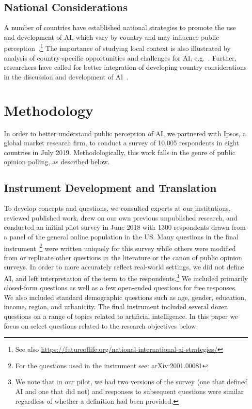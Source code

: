 \documentclass[sigconf]{acmart}
\begin{document}
\subsection{National Considerations}
A number of countries have established national strategies to promote the use and development of AI, which vary by country and may influence public perception~\cite{dutton2018}.\footnote{See also \url{https://futureoflife.org/national-international-ai-strategies/}} 
The importance of studying local context is also illustrated by analysis of country-specific opportunities and challenges for AI, e.g.~\cite{kalyanakrishnan2018opportunities}.
Further, researchers have called for better integration of developing country considerations in the discussion and development of AI~\cite{sambasivan2019toward}.
 
\section{Methodology}
In order to better understand public perception of AI, 
we partnered with Ipsos, a global market research firm, 
to conduct a survey of 10,005 respondents in eight countries in July 2019. Methodologically, this work falls in the genre of public opinion polling, as described below.

\subsection{Instrument Development and Translation}
To develop concepts and questions, we consulted experts at our institutions, reviewed published work, drew on our own previous unpublished research, and conducted an initial pilot survey in June 2018 with 1300 respondents drawn from a panel of the general online population in the US. Many questions in the final instrument~\footnote{For the questions used in the instrument see: \href{https://arxiv.org/abs/2001.00081}{arXiv:2001.00081}} were written uniquely for this survey while others were modified from or replicate other questions in the literature or the canon of public opinion surveys. In order to more accurately reflect real-world settings, we did not define AI, and left interpretation of the term to the respondents.\footnote{We note that in our pilot, we had two versions of the survey (one that defined AI and one that did not) and responses to subsequent questions were similar regardless of whether a definition had been provided.} We included primarily closed-form questions as well as a few open-ended questions for free responses. We also included standard demographic questions such as age, gender, education, income, region, and urbanicity. 
The final instrument included several dozen questions on a range of topics related to artificial intelligence.
In this paper we focus on select questions related to the research objectives below.
\end{document}
